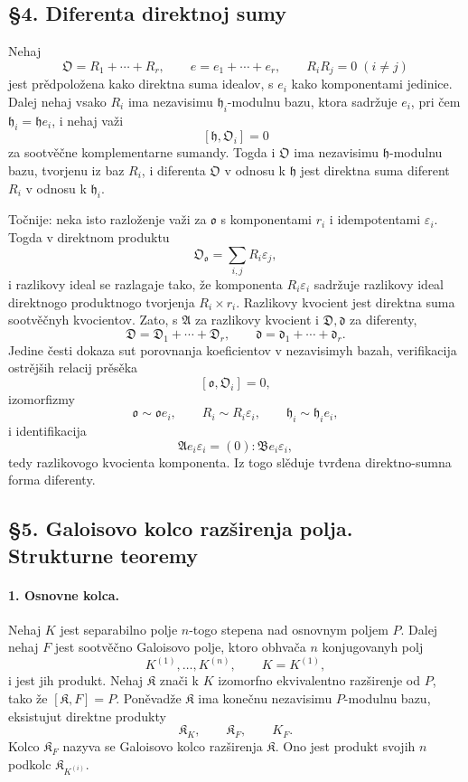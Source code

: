 \documentclass[11pt]{article}
\begin{document}
\subsection*{§4. Diferenta direktnoj sumy}

Nehaj
\[
        \mathfrak O=R_1+\cdots+R_r,
        \qquad
        e=e_1+\cdots+e_r,
        \qquad R_iR_j=0\;(i\ne j)
\]
jest prědpoložena kako direktna suma idealov, s \(e_i\) kako komponentami jedinice. Dalej nehaj vsako \(R_i\) ima nezavisimu \(\mathfrak h_i\)-modulnu bazu, ktora sadržuje \(e_i\), pri čem \(\mathfrak h_i=\mathfrak h e_i\), i nehaj važi
\[
        [\mathfrak h,\mathfrak O_i]=0
\]
za sootvěčne komplementarne sumandy. Togda i \(\mathfrak O\) ima nezavisimu \(\mathfrak h\)-modulnu bazu, tvorjenu iz baz \(R_i\), i diferenta \(\mathfrak O\) v odnosu k \(\mathfrak h\) jest direktna suma diferent \(R_i\) v odnosu k \(\mathfrak h_i\).

Točnije: neka isto razloženje važi za \(\mathfrak o\) s komponentami \(r_i\) i idempotentami \(\varepsilon_i\). Togda v direktnom produktu
\[
        \mathfrak O_{\mathfrak o}=\sum_{i,j} R_i\varepsilon_j,
\]
i razlikovy ideal se razlagaje tako, že komponenta \(R_i\varepsilon_i\) sadržuje razlikovy ideal direktnogo produktnogo tvorjenja \(R_i\times r_i\). Razlikovy kvocient jest direktna suma sootvěčnyh kvocientov. Zato, s \(\mathfrak A\) za razlikovy kvocient i \(\mathfrak D,\mathfrak d\) za diferenty,
\[
        \mathfrak D=\mathfrak D_1+\cdots+\mathfrak D_r,
        \qquad
        \mathfrak d=\mathfrak d_1+
        \cdots+\mathfrak d_r.
\]
Jedine česti dokaza sut porovnanja koeficientov v nezavisimyh bazah, verifikacija ostrějših relacij prěsěka
\[
        [\mathfrak o,\mathfrak O_i]=0,
\]
izomorfizmy
\[
        \mathfrak o\sim\mathfrak o e_i,
        \qquad
        R_i\sim R_i\varepsilon_i,
        \qquad
        \mathfrak h_i\sim \mathfrak h_i e_i,
\]
i identifikacija
\[
        \mathfrak A e_i\varepsilon_i=(0):\mathfrak B e_i\varepsilon_i,
\]
tedy razlikovogo kvocienta komponenta. Iz togo slěduje tvrđena direktno-sumna forma diferenty.

\subsection*{§5. Galoisovo kolco razširenja polja. Strukturne teoremy}

\paragraph{1. Osnovne kolca.}
Nehaj \(K\) jest separabilno polje \(n\)-togo stepena nad osnovnym poljem \(P\). Dalej nehaj \(F\) jest sootvěčno Galoisovo polje, ktoro obhvača \(n\) konjugovanyh polj
\[
        K^{(1)},\ldots,K^{(n)},\qquad K=K^{(1)},
\]
i jest jih produkt. Nehaj \(\mathfrak K\) znači k \(K\) izomorfno ekvivalentno razširenje od \(P\), tako že \([\mathfrak K,F]=P\). Poněvadže \(\mathfrak K\) ima konečnu nezavisimu \(P\)-modulnu bazu, eksistujut direktne produkty
\[
        \mathfrak K_K,
        \qquad \mathfrak K_F,
        \qquad K_F.
\]
Kolco \(\mathfrak K_F\) nazyva se Galoisovo kolco razširenja \(\mathfrak K\). Ono jest produkt svojih \(n\) podkolc \(\mathfrak K_{K^{(i)}}\).
\end{document}

